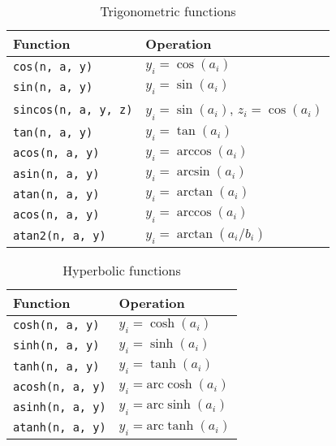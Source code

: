 \begin{table}
  \begin{tabularx}{\textwidth}{XX}
    \toprule
    Function & Operation \\
    \midrule
    \verb|cos(n, a, y)|       & $y_i = \cos(a_i)$                    \\
    \verb|sin(n, a, y)|       & $y_i = \sin(a_i)$                    \\
    \verb|sincos(n, a, y, z)| & $y_i = \sin(a_i)$, $z_i = \cos(a_i)$ \\
    \verb|tan(n, a, y)|       & $y_i = \tan(a_i)$                    \\
    \verb|acos(n, a, y)|      & $y_i = \arccos(a_i)$                 \\
    \verb|asin(n, a, y)|      & $y_i = \arcsin(a_i)$                 \\
    \verb|atan(n, a, y)|      & $y_i = \arctan(a_i)$                 \\
    \verb|acos(n, a, y)|      & $y_i = \arccos(a_i)$                 \\
    \verb|atan2(n, a, y)|     & $y_i = \arctan(a_i / b_i)$           \\
    \bottomrule
  \end{tabularx}
  \caption{Trigonometric functions}
  \label{tab:Trigonometric functions}
\end{table}

\begin{table}
  \begin{tabularx}{\textwidth}{XX}
    \toprule
    Function & Operation \\
    \midrule
    \verb|cosh(n, a, y)|  & $y_i = \cosh(a_i)$             \\
    \verb|sinh(n, a, y)|  & $y_i = \sinh(a_i)$             \\
    \verb|tanh(n, a, y)|  & $y_i = \tanh(a_i)$             \\
    \verb|acosh(n, a, y)| & $y_i = \mathrm{arc}\cosh(a_i)$ \\
    \verb|asinh(n, a, y)| & $y_i = \mathrm{arc}\sinh(a_i)$ \\
    \verb|atanh(n, a, y)| & $y_i = \mathrm{arc}\tanh(a_i)$ \\
    \bottomrule
  \end{tabularx}
  \caption{Hyperbolic functions}
  \label{tab:Hyperbolic functions}
\end{table}

